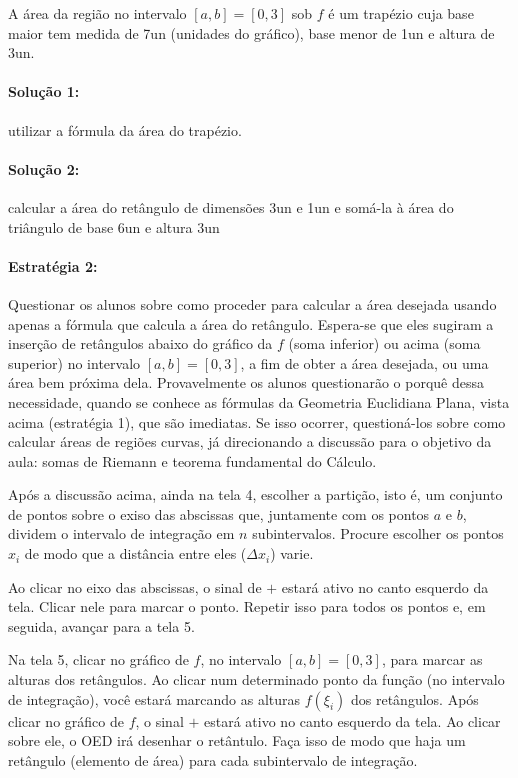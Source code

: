 \documentclass[a4paper,12pt]{scrartcl}
\begin{document}
      A área da região no intervalo $[a,b] = [0,3]$ sob $f$ é um trapézio cuja base maior tem medida de \unit{7}{un} (unidades do gráfico), base menor de \unit{1}{un} e altura de \unit{3}{un}.
      
      \paragraph{Solução 1:} utilizar a fórmula da área do trapézio.
      \paragraph{Solução 2:} calcular a área do retângulo de dimensões \unit{3}{un} e \unit{1}{un} e somá-la à área do triângulo de base \unit{6}{un} e altura \unit{3}{un}
      
      \paragraph{Estratégia 2:} Questionar os alunos sobre como proceder para calcular a área desejada usando apenas a fórmula que calcula a área do retângulo. Espera-se que eles sugiram a inserção de retângulos abaixo do gráfico da $f$ (soma inferior) ou acima (soma superior) no intervalo $[a,b] = [0,3]$, a fim de obter a área desejada, ou uma área bem próxima dela. Provavelmente os alunos questionarão o porquê dessa necessidade, quando se conhece as fórmulas da Geometria Euclidiana Plana, vista acima (estratégia 1), que são imediatas. Se isso ocorrer, questioná-los sobre como calcular áreas de regiões curvas, já direcionando a discussão para o objetivo da aula: somas de Riemann e teorema fundamental do Cálculo.
      
    Após a discussão acima, ainda na tela 4, escolher a partição, isto é, um conjunto de pontos sobre o exiso das abscissas que, juntamente com os pontos $a$ e $b$, dividem o intervalo de integração em $n$ subintervalos. Procure escolher os pontos $x_i$ de modo que a distância entre eles ($\Delta x_i$) varie.
    
    Ao clicar no eixo das abscissas, o sinal de $+$ estará ativo no canto esquerdo da tela. Clicar nele para marcar o ponto. Repetir isso para todos os pontos e, em seguida, avançar para a tela 5.
    
    Na tela 5, clicar no gráfico de $f$, no intervalo $[a,b] = [0,3]$, para marcar as alturas dos retângulos. Ao clicar num determinado ponto da função (no intervalo de integração), você estará marcando as alturas $f(\xi_i)$ dos retângulos. Após clicar no gráfico de $f$, o sinal $+$ estará ativo no canto esquerdo da tela. Ao clicar sobre ele, o OED irá desenhar o retântulo. Faça isso de modo que haja um retângulo (elemento de área) para cada subintervalo de integração.
    
\end{document}
